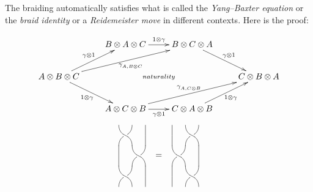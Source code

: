 \documentclass{beamer}
\begin{document}
\begin{frame}
The braiding automatically satisfies what is called the \textit{Yang--Baxter equation} 
or the \textit{braid identity} or a \textit{Reidemeister move} in different contexts. 
Here is the proof:

\[
\xymatrix{
  & B\otimes A \otimes C \ar[r]^-{1\otimes \gamma} 
    & B\otimes C \otimes A \ar[rd]^-{\gamma \otimes 1} \\
 A\otimes B\otimes C 
   \ar[ru]^-{\gamma \otimes 1} \ar[rru]_-{\;\gamma^{}_{A,B\otimes C}} 
    \ar[rd]_-{1\otimes \gamma} \ar@{}[rrr]|{naturality} 
    & & & C\otimes B \otimes A \\
 & A\otimes C \otimes B \ar[rru]^-{\gamma^{}_{A,C\otimes B}} \ar[r]_-{\gamma \otimes 1} 
   & C\otimes A \otimes B \ar[ru]_-{1\otimes \gamma} }
\]
\kern-20pt
\[
\xygraph{
!{/r1.3pc/: /u2pc/::}
!{\vtwistneg}
!{\xcapv-@(0)}
!{\vtwistneg}
[uuurr]
!{\xcapv@(0)}
[l]!{\vtwistneg}
[r]!{\xcapv@(0)}
[r][u(1.5)]
{=}
[r][u(1.5)]
!{\xcapv-@(0)}
!{\vtwistneg}
!{\xcapv-@(0)}
[uuur]
!{\vtwistneg}
[r]!{\xcapv@(0)}
[l]!{\vtwistneg}
}
\]
\end{frame}
\end{document}
